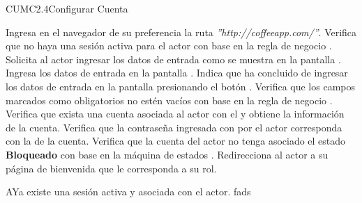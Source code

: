 \begin{UseCase}{CUMC2.4}{Configurar Cuenta}
{	}
%			
\end{UseCase}
		
	\begin{UCtrayectoria}
		\UCpaso[\UCactor] Ingresa en el navegador de su preferencia la ruta \textit{''http://coffeeapp.com/''}.
		\UCpaso Verifica que no haya una sesión activa para el actor con base en la regla de negocio .
		\UCpaso Solicita al actor ingresar los datos de entrada como se muestra en la pantalla .
		\UCpaso[\UCactor] Ingresa los datos de entrada en la pantalla .
		\UCpaso[\UCactor] Indica que ha concluido de ingresar los datos de entrada en la pantalla  presionando el botón .
		\UCpaso Verifica que los campos marcados como obligatorios no estén vacíos con base en la regla de negocio .
		\UCpaso Verifica que exista una cuenta asociada al actor con el  y obtiene la información de la cuenta.
		\UCpaso Verifica que la contraseña ingresada con por el actor corresponda con la  de la cuenta.
		\UCpaso Verifica que la cuenta del actor no tenga asociado el estado \textbf{Bloqueado} con base en la máquina de estados .
		\UCpaso Redirecciona al actor a su página de bienvenida que le corresponda a su rol.	\end{UCtrayectoria}
	

	\begin{UCtrayectoriaA}{A}{Ya existe una sesión activa y asociada con el actor.}
		\UCpaso fads
	
	\end{UCtrayectoriaA}
	